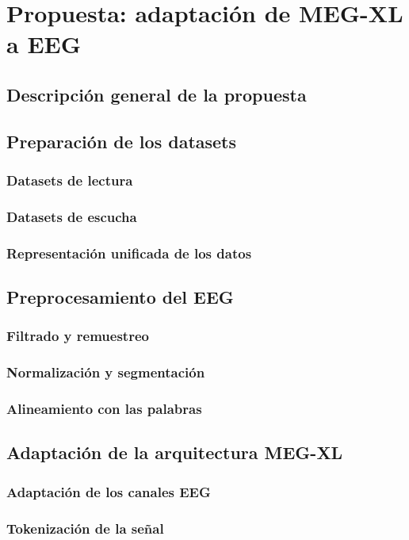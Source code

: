 \chapter{Propuesta: adaptación de MEG-XL a EEG}

\section{Descripción general de la propuesta}

\section{Preparación de los datasets}
\subsection{Datasets de lectura}
\subsection{Datasets de escucha}
\subsection{Representación unificada de los datos}

\section{Preprocesamiento del EEG}
\subsection{Filtrado y remuestreo}
\subsection{Normalización y segmentación}
\subsection{Alineamiento con las palabras}

\section{Adaptación de la arquitectura MEG-XL}
\subsection{Adaptación de los canales EEG}
\subsection{Tokenización de la señal}
